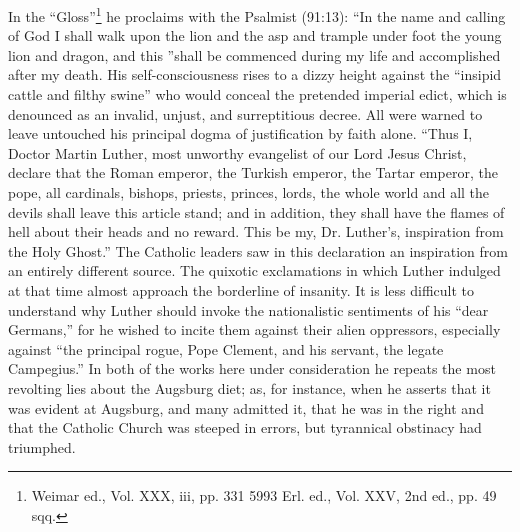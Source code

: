In the “Gloss”\footnote{Weimar ed., Vol. XXX, iii, pp. 331 5993 Erl. ed., Vol.
XXV, 2nd ed., pp. 49 sqq.}
he proclaims with the Psalmist (91:13): “In
the name and calling of God I shall walk upon the lion and the asp
and trample under foot the young lion and dragon, and this ”shall
be commenced during my life and accomplished after my death. His
self-consciousness rises to a dizzy height against the “insipid cattle
and filthy swine” who would conceal the pretended imperial edict,
which is denounced as an invalid, unjust, and surreptitious decree.
All were warned to leave untouched his principal dogma of justification
by faith alone. “Thus I, Doctor Martin Luther, most unworthy
evangelist of our Lord Jesus Christ, declare that the Roman emperor,
the Turkish emperor, the Tartar emperor, the pope, all cardinals,
bishops, priests, princes, lords, the whole world and all the devils shall
leave this article stand; and in addition, they shall have the flames of
hell about their heads and no reward. This be my, Dr. Luther’s, inspiration
from the Holy Ghost.” The Catholic leaders saw in this
declaration an inspiration from an entirely different source. The
quixotic exclamations in which Luther indulged at that time almost
approach the borderline of insanity. It is less difficult to understand
why Luther should invoke the nationalistic sentiments of his “dear
Germans,” for he wished to incite them against their alien oppressors,
especially against “the principal rogue, Pope Clement, and his
servant, the legate Campegius.” In both of the works here under
consideration he repeats the most revolting lies about the Augsburg
diet; as, for instance, when he asserts that it was evident at Augsburg,
and many admitted it, that he was in the right and that the
Catholic Church was steeped in errors, but tyrannical obstinacy had
triumphed.

